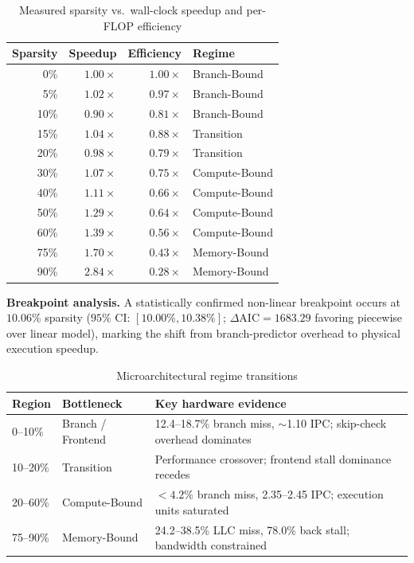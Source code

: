 \documentclass[journal,10pt,twocolumn]{IEEEtran}
\begin{document}
\begin{table}[h]
\centering
\small
\caption{Measured sparsity vs.\ wall-clock speedup and per-FLOP efficiency}
\label{tab:benchmark}
\begin{tabular}{rrrl}
\toprule
Sparsity & Speedup & Efficiency & Regime \\
\midrule
\phantom{0}0\%  & $1.00\times$ & $1.00\times$ & Branch-Bound \\
\phantom{0}5\%  & $1.02\times$ & $0.97\times$ & Branch-Bound \\
10\%            & $0.90\times$ & $0.81\times$ & Branch-Bound \\
15\%            & $1.04\times$ & $0.88\times$ & Transition \\
20\%            & $0.98\times$ & $0.79\times$ & Transition \\
30\%            & $1.07\times$ & $0.75\times$ & Compute-Bound \\
40\%            & $1.11\times$ & $0.66\times$ & Compute-Bound \\
50\%            & $1.29\times$ & $0.64\times$ & Compute-Bound \\
60\%            & $1.39\times$ & $0.56\times$ & Compute-Bound \\
75\%            & $1.70\times$ & $0.43\times$ & Memory-Bound \\
90\%            & $\mathbf{2.84\times}$ & $0.28\times$ & Memory-Bound \\
\bottomrule
\end{tabular}
\end{table}

\textbf{Breakpoint analysis.} A statistically confirmed non-linear breakpoint
occurs at $10.06\%$ sparsity ($95\%$ CI: $[10.00\%, 10.38\%]$;
$\Delta\text{AIC} = 1683.29$ favoring piecewise over linear model), marking
the shift from branch-predictor overhead to physical execution speedup.

\begin{table}[h]
\centering
\small
\caption{Microarchitectural regime transitions}
\label{tab:regimes}
\begin{tabular}{p{1.0cm}p{1.4cm}p{4.8cm}}
\toprule
Region & Bottleneck & Key hardware evidence \\
\midrule
0--10\% & Branch / Frontend & 12.4--18.7\% branch miss, $\sim$1.10 IPC; skip-check overhead dominates \\
10--20\% & Transition & Performance crossover; frontend stall dominance recedes \\
20--60\% & Compute-Bound & ${<}4.2\%$ branch miss, 2.35--2.45 IPC; execution units saturated \\
75--90\% & Memory-Bound & 24.2--38.5\% LLC miss, 78.0\% back stall; bandwidth constrained \\
\bottomrule
\end{tabular}
\end{table}
\end{document}
